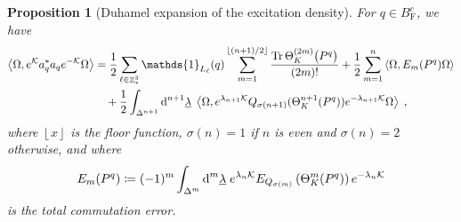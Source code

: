 \documentclass[12pt,a4paper]{article}
\numberwithin{equation}{section}
\newcommand{\cK}{\mathcal{K}}
\newcommand{\1}{\mathbb{I}}
\newcommand{\di}{\textnormal{d}}
\newcommand{\F}{\mathrm{F}}
\DeclareMathOperator{\Z}{\mathbb{Z}}
\newcommand{\half}{\frac{1}{2}}
\newcommand{\eva}[1]{\left\langle #1 \right\rangle}
\newcommand{\floor}[1]{\left\lfloor #1 \right\rfloor}
\theoremstyle{plain}
\newtheorem{proposition}[theorem]{Proposition}
\theoremstyle{definition}
\theoremstyle{remark}
\theoremstyle{plain}
\theoremstyle{definition}
\theoremstyle{remark}
\begin{document}
\begin{proposition}[Duhamel expansion of the excitation density]\label{prop:finexpan}
For $q \in B^c_{\F}$, we have
\begin{align} \label{eq:finexpan}
	\eva{\Omega, e^{\cK} a_q^* a_q e^{-\cK} \Omega} 
	&= \half\sum\limits_{\ell\in \Z^3_*}\mathds{1}_{L_\ell}(q) \sum\limits_{m=1}^{\floor{(n+1)/2}} \frac{\mathrm{Tr}\,\Theta^{(2m)}_K \big(P^q\big)}{(2m)!}
		+ \half \sum\limits_{m=1}^{n} \eva{\Omega, E_m(P^q)\Omega}\nonumber\\
	&\quad +\half \int_{\Delta^{n+1}} \di^{n+1}\underline{\lambda} \;
		\eva{\Omega, e^{\lambda_{n+1} \cK}Q_{\sigma(n+1)}(\Theta^{n+1}_{K}(P^q)) e^{-\lambda_{n+1} \cK} \Omega} \;,
\end{align}
where $ \floor{x} $ is the floor function, $ \sigma(n) = 1 $ if $ n $ is even and $ \sigma(n) = 2 $ otherwise, and where
\begin{equation}\label{eq:errEm}
	E_m(P^q) \coloneq (-1)^m \int_{\Delta^m} \di^m\underline{\lambda} \;
		e^{\lambda_n \cK} E_{Q_{\sigma(m)}}\left(\Theta^{m}_{K}(P^q)\right) e^{-\lambda_n \cK}
\end{equation}
is the total commutation error.
\end{proposition}
\end{document}
